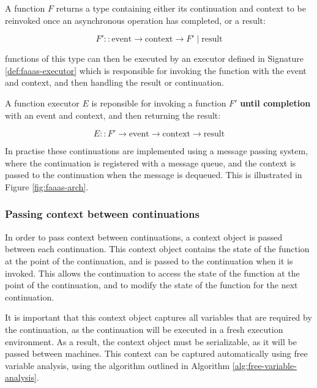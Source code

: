 \begin{signature}
\label{def:faaas-continuation-signature}
A function $F$ returns a type containing either its continuation and context to be reinvoked once an asynchronous operation has completed, or a result:

$$F' :: \textrm{event} \rightarrow \textrm{context} \rightarrow F' \mid \textrm{result}$$
\end{signature}

\faas{} functions of this type can then be executed by an executor defined in Signature \ref{def:faaas-executor} which is responsible for invoking the function with the event and context, and then handling the result or continuation.

\begin{signature}
\label{def:faaas-executor}
A function executor $E$ is reponsible for invoking a function $F'$ \textbf{until completion} with an event and context, and then returning the result:

$$E :: F' \rightarrow \textrm{event} \rightarrow \textrm{context} \rightarrow \textrm{result}$$
\end{signature}

In practise these continuations are implemented using a message passing system, where the continuation is registered with a message queue, and the context is passed to the continuation when the message is dequeued. This is illustrated in Figure \ref{fig:faaas-arch}.

\subsubsection{Passing context between continuations}
In order to pass context between continuations, a context object is passed between each continuation. This context object contains the state of the function at the point of the continuation, and is passed to the continuation when it is invoked. This allows the continuation to access the state of the function at the point of the continuation, and to modify the state of the function for the next continuation.

It is important that this context object captures all variables that are required by the continuation, as the continuation will be executed in a fresh execution environment. As a result, the context object must be serializable, as it will be passed between machines. This context can be captured automatically using free variable analysis, using the algorithm outlined in Algorithm \ref{alg:free-variable-analysis}.

